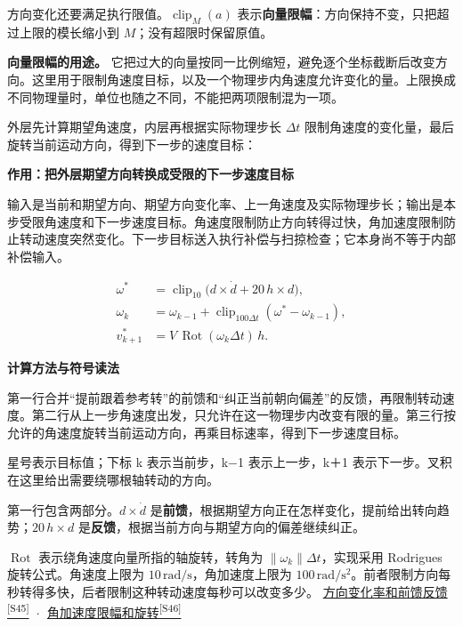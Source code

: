 \documentclass[12pt,a4paper]{article}
\numberwithin{equation}{topic}
\newcommand{\sourceref}[2]{\hyperlink{source-#1}{#2\textsuperscript{[#1]}}}
\begin{document}
方向变化还要满足执行限值。\(\operatorname{clip}_M(a)\) 表示\textbf{向量限幅}：方向保持不变，只把超过上限的模长缩小到 \(M\)；没有超限时保留原值。

\textbf{向量限幅的用途。} 它把过大的向量按同一比例缩短，避免逐个坐标截断后改变方向。这里用于限制角速度目标，以及一个物理步内角速度允许变化的量。上限换成不同物理量时，单位也随之不同，不能把两项限制混为一项。

外层先计算期望角速度，内层再根据实际物理步长 \(\Delta t\) 限制角速度的变化量，最后旋转当前运动方向，得到下一步的速度目标：

\noindent\textbf{作用：把外层期望方向转换成受限的下一步速度目标}\par\nobreak
输入是当前和期望方向、期望方向变化率、上一角速度及实际物理步长；输出是本步受限角速度和下一步速度目标。角速度限制防止方向转得过快，角加速度限制防止转动速度突然变化。下一步目标送入执行补偿与扫掠检查；它本身尚不等于内部补偿输入。

\begin{equation}
\label{eq:rotation}
\begin{aligned}
\omega^*&=\operatorname{clip}_{10}\bigl(d\times\dot d
                   +20\,h\times d\bigr),\\
\omega_k&=\omega_{k-1}
       +\operatorname{clip}_{100\Delta t}(\omega^*-\omega_{k-1}),\\
v^*_{k+1}&=V\,\operatorname{Rot}(\omega_k\Delta t)\,h.
\end{aligned}
\end{equation}

\noindent\textbf{计算方法与符号读法}\par\nobreak
第一行合并“提前跟着参考转”的前馈和“纠正当前朝向偏差”的反馈，再限制转动速度。第二行从上一步角速度出发，只允许在这一物理步内改变有限的量。第三行按允许的角速度旋转当前运动方向，再乘目标速率，得到下一步速度目标。

星号表示目标值；下标 k 表示当前步，k−1 表示上一步，k＋1 表示下一步。叉积在这里给出需要绕哪根轴转动的方向。


第一行包含两部分。\(d\times\dot d\) 是\textbf{前馈}，根据期望方向正在怎样变化，提前给出转向趋势；\(20\,h\times d\) 是\textbf{反馈}，根据当前方向与期望方向的偏差继续纠正。

\(\operatorname{Rot}\) 表示绕角速度向量所指的轴旋转，转角为 \(\|\omega_k\|\Delta t\)，实现采用 Rodrigues 旋转公式。角速度上限为 \(10\,\mathrm{rad/s}\)，角加速度上限为 \(100\,\mathrm{rad/s^2}\)。前者限制方向每秒转得多快，后者限制这种转动速度每秒可以改变多少。 \sourceref{S45}{方向变化率和前馈反馈} · \sourceref{S46}{角加速度限幅和旋转}
\end{document}
